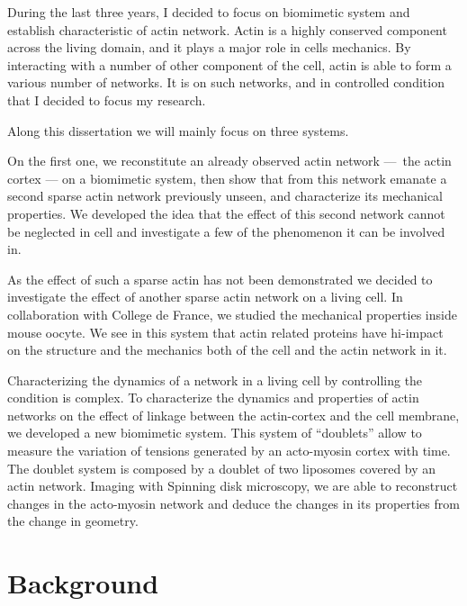 \documentclass[A4paperpaper,11pt,english]{sphinxmanual}
\begin{document}
During the last three years, I decided to focus on biomimetic system and
establish characteristic of actin network. Actin is a highly conserved
component across the living domain, and it plays a major role in cells
mechanics. By interacting with a number of other component of the cell, actin
is able to form a various number of networks. It is on such networks, and in
controlled condition that I decided to focus my research.

Along this dissertation we will mainly focus on three systems.

On the first one, we reconstitute an already observed actin network — the actin
cortex — on a biomimetic system, then show that from this network emanate a
second sparse actin network previously unseen, and characterize its mechanical
properties. We developed the idea that the effect of this second network cannot
be neglected in cell and investigate a few of the phenomenon it can be involved
in.

As the effect of such a sparse actin has not been demonstrated we decided to
investigate the effect of another sparse actin network on a living cell. In
collaboration with College de France, we studied the mechanical properties
inside mouse oocyte. We see in this system that actin related proteins have
hi-impact on the structure and the mechanics both of the cell and the actin
network in it.

Characterizing the dynamics of a network in a living cell by controlling the
condition is complex.  To characterize the dynamics and properties of actin
networks on the effect of linkage between the actin-cortex and the cell
membrane, we developed a new biomimetic system. This system of ``doublets'' allow
to measure the variation of tensions generated by an acto-myosin cortex with
time. The doublet system is composed by a doublet of two liposomes covered by
an actin network. Imaging with Spinning disk microscopy, we are able to
reconstruct changes in the acto-myosin network and deduce the changes in its
properties from the change in geometry.


\chapter{Background}
\label{parts/part1:background}
\end{document}
